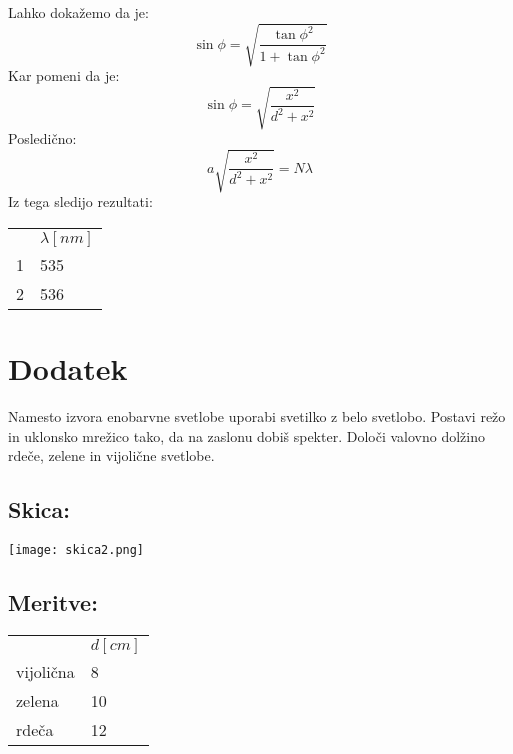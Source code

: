 \documentclass[a4paper]{article}
\begin{document}
Lahko dokažemo da je:
\begin{equation}
   \sin{\phi} = \sqrt{\frac{\tan{\phi}^2}{1+ \tan{\phi}^2}}
\end{equation}
Kar pomeni da je:
\begin{equation}
   \sin{\phi} = \sqrt{\frac{x^2}{d^2 + x^2}}
\end{equation}
Posledično:
\begin{equation}
   a\sqrt{\frac{x^2}{d^2 + x^2}} = N\lambda
\end{equation}
Iz tega sledijo rezultati:
\begin{table}[H]
   \centering
\begin{tabular}{ll}
   & $\lambda[nm]$  \\
1 & 535\\
2 & 536\\
\end{tabular}
\end{table}

 

\section*{Dodatek}
Namesto izvora enobarvne svetlobe uporabi svetilko z belo svetlobo. Postavi režo in uklonsko mrežico tako, da na zaslonu dobiš spekter. Določi valovno dolžino rdeče, zelene in vijolične svetlobe.
\subsection*{Skica:}
\begin{center}
\texttt{[image: skica2.png]}
\end{center}
\subsection*{Meritve:}
\begin{table}[H]
   \centering
\begin{tabular}{ll}
   & $d[cm]$  \\
vijolična & 8\\
zelena & 10\\
rdeča & 12\\
\end{tabular}
\end{table}
\end{document}
